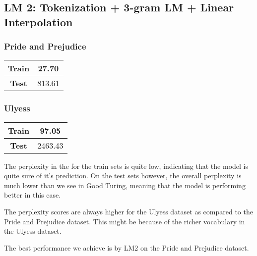 \documentclass[a4paper,9pt]{report}
\begin{document}
\subsection*{LM 2: Tokenization + 3-gram LM + Linear Interpolation}
\subsubsection*{Pride and Prejudice}
\begin{table}[H]
    \centering
    \begin{tabular}{|c|c|}
        \hline
        \textbf{Train} & {27.70} \\
        \hline
        \textbf{Test} & {813.61} \\
        \hline
    \end{tabular}
\end{table}


\subsubsection*{Ulyess}
\begin{table}[H]
    \centering
    \begin{tabular}{|c|c|}
        \hline
        \textbf{Train} & {97.05} \\
        \hline
        \textbf{Test} & {2463.43} \\
        \hline
    \end{tabular}
\end{table}

The perplexity in the for the train sets is quite low, indicating that the model is quite sure of it's prediction. 
On the test sets however, the overall perplexity is much lower than we see in Good Turing, meaning that the model is performing better in this case.

The perplexity scores are always higher for the Ulyess dataset as compared to the Pride and Prejudice dataset. This might be because of the richer vocabulary in the Ulyess dataset.

The best performance we achieve is by LM2 on the Pride and Prejudice dataset.
\end{document}
